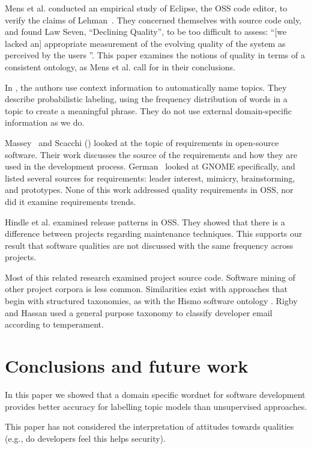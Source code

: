 \documentclass[10pt, conference, compsocconf]{IEEEtran}
\begin{document}
Mens et al. \cite{mens08icsm} conducted an empirical study of Eclipse, the OSS code editor, to verify the claims of Lehman~\cite{lehman97sms}. They concerned themselves with source code only, and found Law Seven, ``Declining Quality'', to be too difficult to assess: ``[we lacked an] appropriate measurement of the evolving quality of the system as perceived by the users \cite[p. 388]{mens08icsm}''. This paper examines the notions of quality in terms of a consistent ontology, as Mens et al. call for in their conclusions.

In \cite{Mei2007}, the authors use context information to automatically name topics. They describe probabilistic labeling, using the frequency distribution of words in a topic to create a meaningful phrase. They do not use external domain-specific information as we do.

Massey~\cite{massey02icse} and Scacchi (\cite{scacchi02,scacchi05b}) looked at the topic of requirements in open-source software. Their work discusses the source of the requirements and how they are used in the development process. German~\cite{german03gnome} looked at GNOME specifically, and listed several sources for requirements: leader interest, mimicry, brainstorming, and prototypes. None of this work  addressed quality requirements in OSS, nor did it examine requirements trends.

Hindle et al. \cite{Hindle2007} examined release patterns in OSS. They showed that there is a difference between projects regarding maintenance techniques. This supports our result that software qualities are not discussed with the same frequency across projects.

Most of this related research examined project source code. Software mining of other project corpora is less common. Similarities exist with approaches that begin with structured taxonomies, as with the Hismo software ontology \cite{girba06}. Rigby and Hassan \cite{rigby07msr} used a general purpose taxonomy to classify developer email according to temperament.

\section{Conclusions and future work}
In this paper we showed that a domain specific wordnet for software development provides better accuracy for labelling topic models than unsupervised approaches.

This paper has not considered the interpretation of attitudes towards qualities (e.g., do developers feel this helps security).
\end{document}
